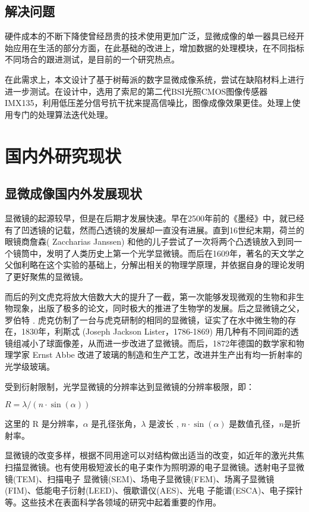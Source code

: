 \subsection{解决问题}
硬件成本的不断下降使曾经昂贵的技术使用更加广泛，显微成像的单一器具已经开始应用在生活的部分方面，在此基础的改进上，增加数据的处理模块，在不同指标不同场合的跟进测试，是目前的一个研究热点。

在此需求上，本文设计了基于树莓派的数字显微成像系统，尝试在缺陷材料上进行进一步测试。在设计中，选用了索尼的第二代BSI光照CMOS图像传感器IMX135，利用低压差分信号抗干扰来提高信噪比，图像成像效果更佳。处理上使用专门的处理算法迭代处理。


\section{国内外研究现状}
\subsection{显微成像国内外发展现状}
显微镜的起源较早，但是在后期才发展快速。早在2500年前的《墨经》中，就已经有了凹透镜的记载，然而凸透镜的发展却一直没有进展。直到16世纪末期，荷兰的眼镜商詹森( Zaccharias Janssen) 和他的儿子尝试了一次将两个凸透镜放入到同一个镜筒中，发明了人类历史上第一个光学显微镜。而后在1609年，著名的天文学之父伽利略在这个实验的基础上，分解出相关的物理学原理，并依据自身的理论发明了更好聚焦的显微镜。

而后的列文虎克将放大倍数大大的提升了一截，第一次能够发现微观的生物和非生物现象，出版了极多的论文，同时极大的推进了生物学的发展。后之显微镜之父，罗伯特﹒虎克仿制了一台与虎克研制的相同的显微镜，证实了在水中微生物的存在，1830年，利斯忒 (Joseph Jackson Lister，1786-1869) 用几种有不同间距的透镜组减小了球面像差，从而进一步改进了显微镜。而后，1872年德国的数学家和物理学家 Ernst Abbe 改进了玻璃的制造和生产工艺，改进并生产出有均一折射率的光学级玻璃。\cite{microimaging}\cite{microimagingelc}

受到衍射限制，光学显微镜的分辨率达到显微镜的分辨率极限，即：
\begin{center}
	$ R = \lambda/(n \cdot \sin(\alpha)) $ 
\end{center}
这里的 R 是分辨率，$\alpha$ 是孔径张角，$\lambda$ 是波长 , $n\cdot\sin(\alpha)$ 是数值孔径，$n$是折射率。 
	
显微镜的改变多样，根据不同用途可以对结构做出适当的改变，如近年的激光共焦扫描显微镜。也有使用极短波长的电子束作为照明源的电子显微镜。透射电子显微镜(TEM)、扫描电子
显微镜(SEM)、场电子显微镜(FEM)、场离子显微镜(FIM)、低能电子衍射(LEED)、俄歇谱仪(AES)、光电
子能谱(ESCA)、电子探针等。这些技术在表面科学各领域的研究中起着重要的作用\cite{xianwei}。

